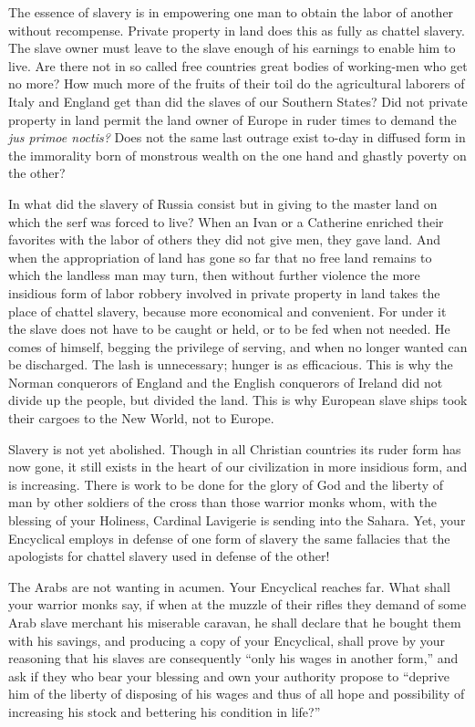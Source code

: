 \documentclass{book}
\begin{document}
The essence of slavery is in empowering one man to obtain the labor of another without recompense. Private property in land does this as fully as chattel slavery. The slave owner must leave to the slave enough of his earnings to enable him to live. Are there not in so called free countries great bodies of working-men who get no more? How much more of the fruits of their toil do the agricultural laborers of Italy and England get than did the slaves of our Southern States? Did not private property in land permit the land owner of Europe in ruder times to demand the \emph{jus primoe noctis?} Does not the same last outrage exist to-day in diffused form in the immorality born of monstrous wealth on the one hand and ghastly poverty on the other?

In what did the slavery of Russia consist but in giving to the master land on which the serf was forced to live? When an Ivan or a Catherine enriched their favorites with the labor of others they did not give men, they gave land. And when the appropriation of land has gone so far that no free land remains to which the landless man may turn, then without further violence the more insidious form of labor robbery involved in private property in land takes the place of chattel slavery, because more economical and convenient. For under it the slave does not have to be caught or held, or to be fed when not needed. He comes of himself, begging the privilege of serving, and when no longer wanted can be discharged. The lash is unnecessary; hunger is as efficacious. This is why the Norman conquerors of England and the English conquerors of Ireland did not divide up the people, but divided the land. This is why European slave ships took their cargoes to the New World, not to Europe.

Slavery is not yet abolished. Though in all Christian countries its ruder form has now gone, it still exists in the heart of our civilization in more insidious form, and is increasing. There is work to be done for the glory of God and the liberty of man by other soldiers of the cross than those warrior monks whom, with the blessing of your Holiness, Cardinal Lavigerie is sending into the Sahara. Yet, your Encyclical employs in defense of one form of slavery the same fallacies that the apologists for chattel slavery used in defense of the other!

The Arabs are not wanting in acumen. Your Encyclical reaches far. What shall your warrior monks say, if when at the muzzle of their rifles they demand of some Arab slave merchant his miserable caravan, he shall declare that he bought them with his savings, and producing a copy of your Encyclical, shall prove by your reasoning that his slaves are consequently “only his wages in another form,” and ask if they who bear your blessing and own your authority propose to “deprive him of the liberty of disposing of his wages and thus of all hope and possibility of increasing his stock and bettering his condition in life?”
\end{document}
